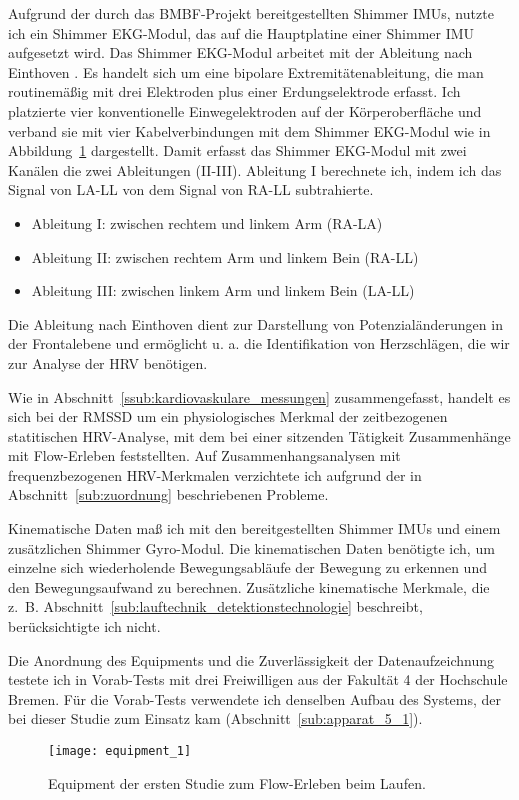 Aufgrund der durch das \acs{BMBF}-Projekt bereitgestellten Shimmer \acp{IMU}, nutzte ich ein Shimmer \ac{EKG}-Modul, das auf die Hauptplatine einer Shimmer \ac{IMU} aufgesetzt wird. Das Shimmer \ac{EKG}-Modul arbeitet mit der Ableitung nach Einthoven \citep[][S.~85ff.]{Behrends2002}. Es handelt sich um eine bipolare Extremitätenableitung, die man routinemäßig mit drei Elektroden plus einer Erdungselektrode erfasst. Ich platzierte vier konventionelle Einwegelektroden auf der Körperoberfläche und verband sie mit vier Kabelverbindungen mit dem Shimmer \ac{EKG}-Modul wie in Abbildung~\ref{fig:equipment_1} dargestellt. Damit erfasst das Shimmer \ac{EKG}-Modul mit zwei Kanälen die zwei Ableitungen (II-III). Ableitung I berechnete ich, indem ich das Signal von LA-LL von dem Signal von RA-LL subtrahierte. 
\begin{itemize}
	\item Ableitung I: zwischen rechtem und linkem Arm (RA-LA) 
	\item Ableitung II: zwischen rechtem Arm und linkem Bein (RA-LL) 
	\item Ableitung III: zwischen linkem Arm und linkem Bein (LA-LL) 
\end{itemize}

Die Ableitung nach Einthoven dient zur Darstellung von Potenzialänderungen in der Frontalebene und ermöglicht u. a. die Identifikation von Herzschlägen, die wir zur Analyse der \ac{HRV} benötigen.

Wie in Abschnitt~\ref{ssub:kardiovaskulare_messungen} zusammengefasst, handelt es sich bei der \acs{RMSSD} um ein physiologisches Merkmal der zeitbezogenen statitischen \ac{HRV}-Analyse, mit dem \citet{Keller2011} bei einer sitzenden Tätigkeit Zusammenhänge mit Flow-Erleben feststellten. Auf Zusammenhangsanalysen mit frequenzbezogenen \ac{HRV}-Merkmalen verzichtete ich aufgrund der in Abschnitt~\ref{sub:zuordnung} beschriebenen Probleme.

Kinematische Daten maß ich mit den bereitgestellten Shimmer \acp{IMU} und einem zusätzlichen Shimmer Gyro-Modul. Die kinematischen Daten benötigte ich, um einzelne sich wiederholende Bewegungsabläufe der Bewegung zu erkennen und den Bewegungsaufwand zu berechnen. Zusätzliche kinematische Merkmale, die z.~B. Abschnitt~\ref{sub:lauftechnik_detektionstechnologie} beschreibt, berücksichtigte ich nicht.

Die Anordnung des Equipments und die Zuverlässigkeit der Datenaufzeichnung testete ich in Vorab-Tests mit drei Freiwilligen aus der Fakultät 4 der Hochschule Bremen. Für die Vorab-Tests verwendete ich denselben Aufbau des Systems, der bei dieser Studie zum Einsatz kam (Abschnitt~\ref{sub:apparat_5_1}). 
\begin{figure}
	[!htb] \centering 
	\texttt{[image: equipment\_1]} \caption[Equipment (Erste Studie: Laufen)]{Equipment der ersten Studie zum Flow-Erleben beim Laufen.} \label{fig:equipment_1} 
\end{figure}


